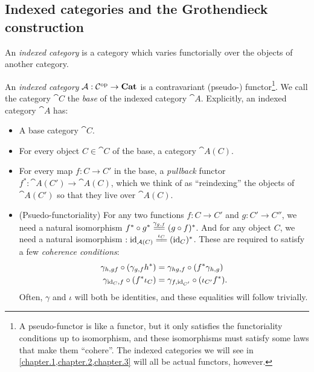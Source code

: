 \documentclass[DynamicalBook]{subfiles}
\begin{document}
\subsection{Indexed categories and the Grothendieck construction}\label{sec.indexed_categories}

An \emph{indexed category} is a category which varies functorially over the
objects of another category.

\begin{definition}
  An \emph{indexed category} $\mathcal{A} : \mathcal{C}^{\textnormal{op}} \to \textbf{Cat}$ is a
  contravariant (pseudo-) functor\footnote{A pseudo-functor is like a functor,
    but it only satisfies the functoriality conditions up to isomorphism, and
    these isomorphisms must satisfy some laws that make them ``cohere''. The
    indexed categories we will see in \cref{chapter.1,chapter.2,chapter.3}
    will all be actual functors, however.}. We call the category $\cat{C}$ the
  \emph{base} of the indexed category $\cat{A}$. Explicitly, an indexed
  category $\cat{A}$ has:
  \begin{itemize}
  \item A base category $\cat{C}$.
  \item For every object $C \in \cat{C}$ of the base, a category $\cat{A}(C)$.
  \item For every map $f : C \to C'$ in the base, a \emph{pullback} functor
    $f^{\ast} : \cat{A}(C') \to \cat{A}(C)$, which we think of as ``reindexing''
    the objects of $\cat{A}(C')$ so that they live over $\cat{A}(C)$.
  \item (Psuedo-functoriality) For any two functions $f : C \to C'$ and $g : C' \to C''$, we need a
    natural isomorphism $f^{\ast} \circ g^{\ast} \xequals{\gamma_{g, f}} (g \circ
    f)^{\ast}$. And for any object $C$, we need a natural isomorphism $:
    \id_{\cat{A}(C)} \xequals{\iota_C } (\id_C)^{\ast}$. These are required to satisfy a
    few \emph{coherence conditions}:
\begin{align}
  \gamma_{h,gf} \circ (\gamma_{g, f}h^{\ast}) &= \gamma_{hg, f} \circ (f^{\ast}\gamma_{h, g}) \\
  \gamma_{\mathrm{id}_C, f} \circ (f^{\ast}\iota_C) &= \gamma_{f, \mathrm{id}_{C'}} \circ (\iota_{C'} f^{\ast}).
\end{align}
   Often, $\gamma$ and $\iota$ will both be identities, and these equalities
   will follow trivially.
  \end{itemize}
\end{definition}
\end{document}
